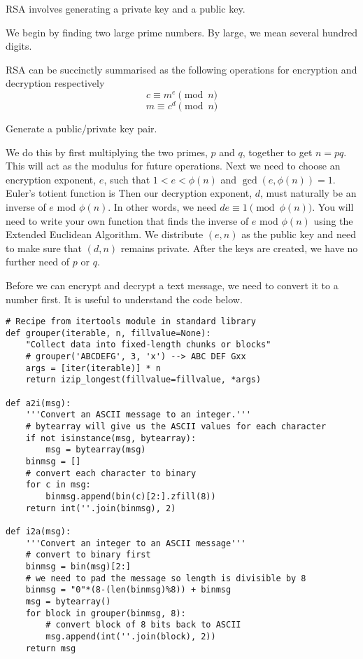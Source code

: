 RSA involves generating a private key and a public key.

We begin by finding two large prime numbers.
By large, we mean several hundred digits.

RSA can be succinctly summarised as the following operations for encryption and decryption respectively
\[
c \equiv m^e \pmod{n}
\]
\[
m \equiv c^d \pmod{n}
\]

\begin{problem}
Generate a public/private key pair.

We do this by first multiplying the two primes, $p$ and $q$, together to get $n=pq$.
This will act as the modulus for future operations.
Next we need to choose an encryption exponent, $e$, such that $1 < e < \phi(n)$ and $\gcd(e, \phi(n)) = 1$.
Euler's totient function is 
Then our decryption exponent, $d$, must naturally be an inverse of $e$ mod $\phi(n)$.
In other words, we need $de \equiv 1 \pmod{\phi(n)}$.
You will need to write your own function that finds the inverse of $e$ mod $\phi(n)$ using the Extended Euclidean Algorithm.
We distribute $(e, n)$ as the public key and need to make sure that $(d, n)$ remains private.
After the keys are created, we have no further need of $p$ or $q$.
\end{problem}

Before we can encrypt and decrypt a text message, we need to convert it to a number first.
It is useful to understand the code below.
\begin{lstlisting}
# Recipe from itertools module in standard library
def grouper(iterable, n, fillvalue=None):
    "Collect data into fixed-length chunks or blocks"
    # grouper('ABCDEFG', 3, 'x') --> ABC DEF Gxx
    args = [iter(iterable)] * n
    return izip_longest(fillvalue=fillvalue, *args)
    
def a2i(msg):
    '''Convert an ASCII message to an integer.'''
    # bytearray will give us the ASCII values for each character
    if not isinstance(msg, bytearray):
        msg = bytearray(msg)
    binmsg = []
    # convert each character to binary
    for c in msg:
        binmsg.append(bin(c)[2:].zfill(8))
    return int(''.join(binmsg), 2)

def i2a(msg):
    '''Convert an integer to an ASCII message'''
    # convert to binary first
    binmsg = bin(msg)[2:]
    # we need to pad the message so length is divisible by 8
    binmsg = "0"*(8-(len(binmsg)%8)) + binmsg
    msg = bytearray()
    for block in grouper(binmsg, 8):
        # convert block of 8 bits back to ASCII
        msg.append(int(''.join(block), 2))
    return msg
\end{lstlisting}

